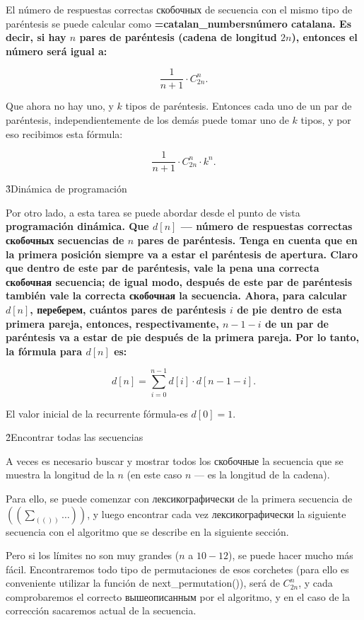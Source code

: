 El número de respuestas correctas скобочных de secuencia con el mismo tipo de paréntesis se puede calcular como \bf{\algohref=catalan_numbers{número catalana}}. Es decir, si hay $n$ pares de paréntesis (cadena de longitud $2n$), entonces el número será igual a:

$$ \frac{1}{n+1} \cdot C^n_{2n}. $$

Que ahora no hay uno, y $k$ tipos de paréntesis. Entonces cada uno de un par de paréntesis, independientemente de los demás puede tomar uno de $k$ tipos, y por eso recibimos esta fórmula:

$$ \frac{1}{n+1} \cdot C^n_{2n} \cdot k^n. $$

\h3{Dinámica de programación}

Por otro lado, a esta tarea se puede abordar desde el punto de vista \bf{programación dinámica}. Que $d[n]$ --- número de respuestas correctas скобочных secuencias de $n$ pares de paréntesis. Tenga en cuenta que en la primera posición siempre va a estar el paréntesis de apertura. Claro que dentro de este par de paréntesis, vale la pena una correcta скобочная secuencia; de igual modo, después de este par de paréntesis también vale la correcta скобочная la secuencia. Ahora, para calcular $d[n]$, переберем, cuántos pares de paréntesis $i$ de pie dentro de esta primera pareja, entonces, respectivamente, $n-1-i$ de un par de paréntesis va a estar de pie después de la primera pareja. Por lo tanto, la fórmula para $d[n]$ es:

$$ d[n] = \sum_{i=0}^{n-1} d[i] \cdot d[n-1-i]. $$

El valor inicial de la recurrente fórmula-es $d[0] = 1$.


\h2{Encontrar todas las secuencias}

A veces es necesario buscar y mostrar todos los скобочные la secuencia que se muestra la longitud de la $n$ (en este caso $n$ --- es la longitud de la cadena).

Para ello, se puede comenzar con лексикографически de la primera secuencia de $((\sum_(())\ldots))$, y luego encontrar cada vez лексикографически la siguiente secuencia con el algoritmo que se describe en la siguiente sección.

Pero si los límites no son muy grandes ($n$ a $10-12$), se puede hacer mucho más fácil. Encontraremos todo tipo de permutaciones de esos corchetes (para ello es conveniente utilizar la función de next_permutation()), será de $C_{2n}^n$, y cada comprobaremos el correcto вышеописанным por el algoritmo, y en el caso de la corrección sacaremos actual de la secuencia.

